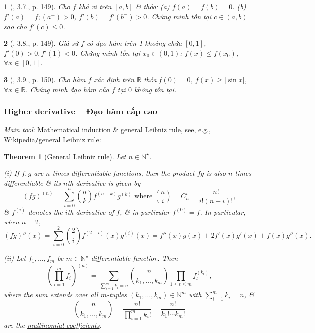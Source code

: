 \documentclass{article}
\newtheorem{baitoan}{}
\newtheorem{theorem}{Theorem}
\begin{document}
\begin{baitoan}[\cite{Quoc_Long_Dat_Nam_VMC}, 3.7., p. 149]
	Cho $f$ khả vi trên $[a,b]$ \& thỏa: (a) $f(a) = f(b) = 0$. (b) $f'(a) = f;(a^+) > 0$, $f'(b) = f'(b^-) > 0$. Chứng minh tồn tại $c\in(a,b)$ sao cho $f'(c)\le0$.
\end{baitoan}

\begin{baitoan}[\cite{Quoc_Long_Dat_Nam_VMC}, 3.8., p. 149]
	Giả sử $f$ có đạo hàm trên 1 khoảng chứa $[0,1]$, $f'(0) > 0,f'(1) < 0$. Chứng minh tồn tại $x_0\in(0,1)$: $f(x)\le f(x_0)$, $\forall x\in[0,1]$.
\end{baitoan}

\begin{baitoan}[\cite{Quoc_Long_Dat_Nam_VMC}, 3.9., p. 150]
	Cho hàm $f$ xác định trên $\mathbb{R}$ thỏa $f(0) = 0$, $f(x)\ge|\sin x|$, $\forall x\in\mathbb{R}$. Chứng minh đạo hàm của $f$ tại $0$ không tồn tại.
\end{baitoan}


\subsubsection{Higher derivative -- Đạo hàm cấp cao}
{\it Main tool}: Mathematical induction \& general Leibniz rule, see, e.g., \href{https://en.wikipedia.org/wiki/General_Leibniz_rule}{Wikipedia{\tt/}general Leibniz rule}:

\begin{theorem}[General Leibniz rule]
	Let $n\in\mathbb{N}^\star$.
	\item(i) If $f,g$ are $n$-times differentiable functions, then the product $fg$ is also $n$-times differentiable \& its $n$th derivative is given by
	\begin{equation*}
		(fg)^{(n)} = \sum_{i=0}^n \binom{n}{k}f^{(n-k)}g^{(k)}\mbox{ where }\binom{n}{i} = C_n^i = \frac{n!}{i!(n - i)!},
	\end{equation*}
	\& $f^{(i)}$ denotes the $i$th derivative of $f$, \& in particular $f^{(0)} = f$. In particular, when $n = 2$,
	\begin{equation*}
		(fg)''(x) = \sum_{i=0}^2 \binom{2}{i}f^{(2-i)}(x)g^{(i)}(x) = f''(x)g(x) + 2f'(x)g'(x) + f(x)g''(x).
	\end{equation*}
	\item(ii) Let $f_1,\ldots,f_m$ be $m\in\mathbb{N}^\star$ differentiable function. Then
	\begin{equation*}
		\left(\prod_{i=1}^m f_i\right)^{(n)} = \sum_{\sum_{i=1}^m k_i = n} \binom{n}{k_1,\ldots,k_m}\prod_{1\le t\le m} f_t^{(k_t)},
	\end{equation*}
	where the sum extends over all $m$-tuples $(k_1,\ldots,k_m)\in\mathbb{N}^m$ with $\sum_{i=1}^m k_i = n$, \&
	\begin{equation*}
		\binom{n}{k_1,\ldots,k_m} = \frac{n!}{\prod_{i=1}^m k_i!} = \frac{n!}{k_1!\cdots k_m!}
	\end{equation*}
	are the \href{https://en.wikipedia.org/wiki/Multinomial_coefficient}{multinomial coefficients}.
\end{theorem}
\end{document}
